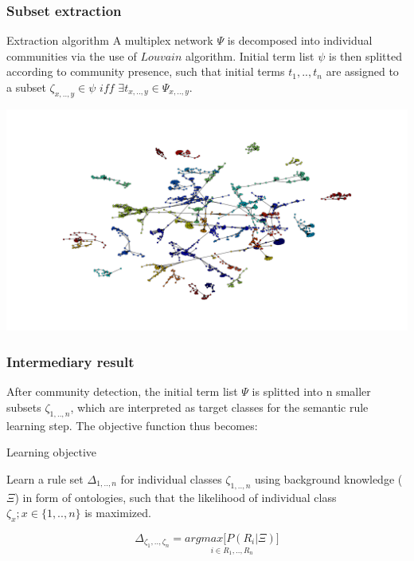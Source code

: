 \documentclass{beamer}
\begin{document}
\begin{frame}\frametitle{Subset extraction}

  \begin{block}{Extraction algorithm}
    A multiplex network $ \Psi $ is decomposed into individual communities via the use of $Louvain$ algorithm. Initial term list $\psi $ is then splitted according to community presence, such that initial terms $ t_{1},..,t_{n} $ are assigned to a subset $\zeta_{x,..,y} \in \psi$ $iff$ $\exists t_{x,..,y} \in \Psi_{x,..,y}$.
  \end{block}
  \begin{center}
 \includegraphics[scale=0.20]{images/biomine_community}
  \end{center}

\end{frame}


\begin{frame}\frametitle{Intermediary result}

  After community detection, the initial term list $\Psi$ is splitted into n smaller subsets $\zeta_{1,..,n}$, which are interpreted as target classes for the semantic rule learning step. The objective function thus becomes:

  \begin{alertblock}{Learning objective}

    Learn a rule set $\Delta_{1,..,n}$  for individual classes $\zeta_{1,..,n}$ using background knowledge ($\Xi$) in form of ontologies, such that the likelihood of individual class $\zeta_{x};x \in \{1,..,n\}$ is maximized.

    \begin{equation}
      \Delta_{\zeta_{1},..,\zeta_{n}} = \underset{i \in R_{1},..,R_{n}}{argmax \Big[P(R_{i}|\Xi) \Big]}
    \end{equation}
    
    \end{alertblock}
  
  \end{frame}
\end{document}

